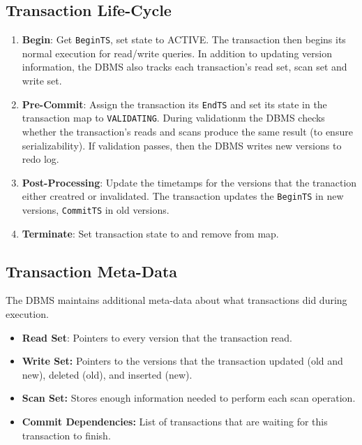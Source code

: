 \documentclass[11pt]{article}
\newcommand{\mvccField}[1]{\texttt{#1}\xspace}
\begin{document}
\subsection*{Transaction Life-Cycle}
\begin{enumerate}
    \item \textbf{Begin}:
    Get \mvccField{BeginTS}, set state to ACTIVE. The transaction then begins its normal 
    execution for read/write queries. In addition to updating version information, the DBMS
    also tracks each transaction's read set, scan set and write set.
    
    \item \textbf{Pre-Commit}:
    Assign the transaction its \mvccField{EndTS} and set its state in the transaction map to 
    \texttt{VALIDATING}. During validationm the DBMS checks whether the transaction's reads and 
    scans produce the same result (to ensure serializability). If validation passes, then the DBMS 
    writes new versions to redo log.
    
    \item \textbf{Post-Processing}:
    Update the timetamps for the versions that the tranaction either creatred or 
    invalidated. The transaction updates the \mvccField{BeginTS} in new versions, \texttt{CommitTS} 
    in old versions.
    
    \item \textbf{Terminate}:
    Set transaction state to  and remove from map.
\end{enumerate}

\subsection*{Transaction Meta-Data}
The DBMS maintains additional meta-data about what transactions did during execution.

\begin{itemize}
    \item \textbf{Read Set}:
    Pointers to every version that the transaction read.
    
    \item \textbf{Write Set:}
    Pointers to the versions that the transaction updated (old and new), deleted (old), 
    and inserted (new).
    
    \item \textbf{Scan Set:}
    Stores enough information needed to perform each scan operation.
    
    \item \textbf{Commit Dependencies:}
    List of transactions that are waiting for this transaction to finish.
\end{itemize}
\end{document}
